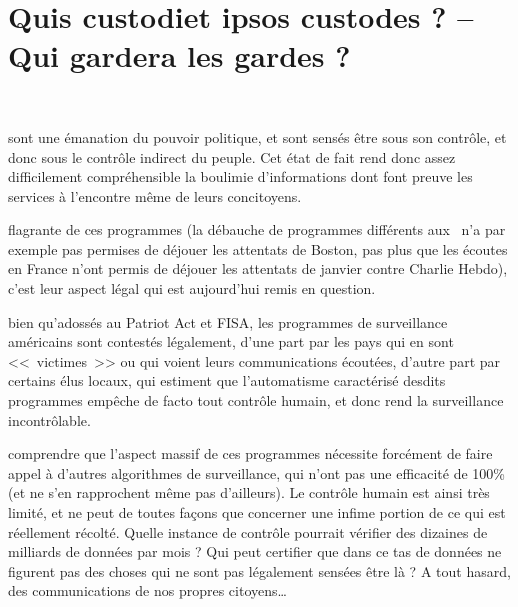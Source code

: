 
\chapter{Quis custodiet ipsos custodes ? -- Qui gardera les gardes ?}
\label{impact}

~\vfill
\begin{doublespace}
\noindent\fontsize{18}{22}\selectfont\itshape
\nohyphenation
{}
\end{doublespace}
\vfill
\vfill

 sont une émanation du pouvoir
politique, et sont sensés être sous son contrôle, et donc sous le contrôle
indirect du peuple. Cet état de fait rend donc assez difficilement
compréhensible la boulimie d'informations dont font preuve les services à
l'encontre même de leurs  concitoyens.

 flagrante de ces programmes\cite{surve}
(la débauche de programmes différents aux \EUA~n'a par exemple pas permises de
déjouer les attentats de Boston, pas plus que les écoutes en France n'ont permis de déjouer
les attentats de janvier contre Charlie Hebdo), c'est leur aspect légal qui est
aujourd'hui remis en question.

 bien qu'adossés au Patriot Act et FISA, les programmes
de surveillance américains sont contestés légalement, d'une part par les pays qui
en sont <<~victimes~>> ou qui voient leurs communications écoutées, d'autre part
par certains élus locaux, qui estiment que l'automatisme caractérisé desdits
programmes empêche de facto tout contrôle humain, et donc rend la surveillance
incontrôlable.

 comprendre que l'aspect massif de ces programmes
nécessite forcément de faire appel à d'autres algorithmes de surveillance, qui
n'ont pas une efficacité de 100\% (et ne s'en rapprochent même pas d'ailleurs).
Le contrôle humain est ainsi très limité, et ne peut de toutes façons que
concerner une infime portion de ce qui est réellement récolté. Quelle instance
de contrôle pourrait vérifier des dizaines de milliards de données par mois ?
Qui peut certifier que dans ce tas de données ne figurent pas des choses qui ne
sont pas légalement sensées être là ? A tout hasard, des communications de nos propres
citoyens\ldots 

